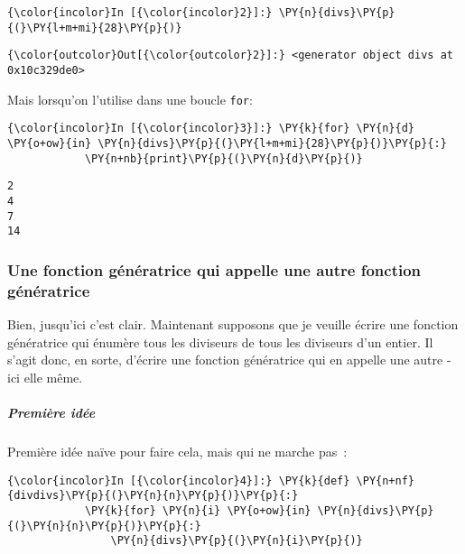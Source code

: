     \begin{Verbatim}[commandchars=\\\{\}]
{\color{incolor}In [{\color{incolor}2}]:} \PY{n}{divs}\PY{p}{(}\PY{l+m+mi}{28}\PY{p}{)}
\end{Verbatim}


\begin{Verbatim}[commandchars=\\\{\}]
{\color{outcolor}Out[{\color{outcolor}2}]:} <generator object divs at 0x10c329de0>
\end{Verbatim}
            
    Mais lorsqu'on l'utilise dans une boucle \texttt{for}:

    \begin{Verbatim}[commandchars=\\\{\}]
{\color{incolor}In [{\color{incolor}3}]:} \PY{k}{for} \PY{n}{d} \PY{o+ow}{in} \PY{n}{divs}\PY{p}{(}\PY{l+m+mi}{28}\PY{p}{)}\PY{p}{:}
            \PY{n+nb}{print}\PY{p}{(}\PY{n}{d}\PY{p}{)}
\end{Verbatim}


    \begin{Verbatim}[commandchars=\\\{\}]
2
4
7
14

    \end{Verbatim}

    \hypertarget{une-fonction-guxe9nuxe9ratrice-qui-appelle-une-autre-fonction-guxe9nuxe9ratrice}{%
\subsubsection{Une fonction génératrice qui appelle une autre fonction
génératrice}\label{une-fonction-guxe9nuxe9ratrice-qui-appelle-une-autre-fonction-guxe9nuxe9ratrice}}

    Bien, jusqu'ici c'est clair. Maintenant supposons que je veuille écrire
une fonction génératrice qui énumère tous les diviseurs de tous les
diviseurs d'un entier. Il s'agit donc, en sorte, d'écrire une fonction
génératrice qui en appelle une autre - ici elle même.

    \hypertarget{premiuxe8re-iduxe9e}{%
\subparagraph{Première idée}\label{premiuxe8re-iduxe9e}}

    Première idée naïve pour faire cela, mais qui ne marche pas~:

    \begin{Verbatim}[commandchars=\\\{\}]
{\color{incolor}In [{\color{incolor}4}]:} \PY{k}{def} \PY{n+nf}{divdivs}\PY{p}{(}\PY{n}{n}\PY{p}{)}\PY{p}{:}
            \PY{k}{for} \PY{n}{i} \PY{o+ow}{in} \PY{n}{divs}\PY{p}{(}\PY{n}{n}\PY{p}{)}\PY{p}{:}
                \PY{n}{divs}\PY{p}{(}\PY{n}{i}\PY{p}{)}
\end{Verbatim}


